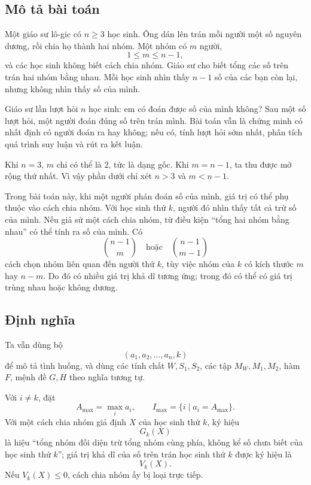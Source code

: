 \documentclass[11pt]{article}
\begin{document}
\subsection*{Mô tả bài toán}

Một giáo sư lô-gic có \(n\ge 3\) học sinh. Ông dán lên trán mỗi người một số
nguyên dương, rồi chia họ thành hai nhóm. Một nhóm có \(m\) người,
\[
  1\le m\le n-1,
\]
và các học sinh không biết cách chia nhóm. Giáo sư cho biết tổng các số trên
trán hai nhóm bằng nhau. Mỗi học sinh nhìn thấy \(n-1\) số của các bạn còn
lại, nhưng không nhìn thấy số của mình.

Giáo sư lần lượt hỏi \(n\) học sinh: em có đoán được số của mình không? Sau
một số lượt hỏi, một người đoán đúng số trên trán mình. Bài toán vẫn là
chứng minh có nhất định có người đoán ra hay không; nếu có, tính lượt hỏi sớm
nhất, phân tích quá trình suy luận và rút ra kết luận.

Khi \(n=3\), \(m\) chỉ có thể là \(2\), tức là dạng gốc. Khi \(m=n-1\), ta
thu được mở rộng thứ nhất. Vì vậy phần dưới chỉ xét \(n>3\) và \(m<n-1\).

Trong bài toán này, khi một người phán đoán số của mình, giá trị có thể phụ
thuộc vào cách chia nhóm. Với học sinh thứ \(k\), người đó nhìn thấy tất cả
trừ số của mình. Nếu giả sử một cách chia nhóm, từ điều kiện ``tổng hai nhóm
bằng nhau'' có thể tính ra số của mình. Có
\[
  \binom{n-1}{m}\quad\text{hoặc}\quad \binom{n-1}{m-1}
\]
cách chọn nhóm liên quan đến người thứ \(k\), tùy việc nhóm của \(k\) có
kích thước \(m\) hay \(n-m\). Do đó có nhiều giá trị khả dĩ tương ứng; trong
đó có thể có giá trị trùng nhau hoặc không dương.

\subsection*{Định nghĩa}

Ta vẫn dùng bộ
\[
  (a_1,a_2,\ldots,a_n,k)
\]
để mô tả tình huống, và dùng các tính chất \(W,S_1,S_2\), các tập
\(M_W,M_1,M_2\), hàm \(F\), mệnh đề \(G,H\) theo nghĩa tương tự.

Với \(i\ne k\), đặt
\[
  A_{\max}=\max_i a_i,\qquad
  I_{\max}=\{i\mid a_i=A_{\max}\}.
\]
Với một cách chia nhóm giả định \(X\) của học sinh thứ \(k\), ký hiệu
\[
  G_k(X)
\]
là hiệu ``tổng nhóm đối diện trừ tổng nhóm cùng phía, không kể số chưa biết
của học sinh thứ \(k\)''; giá trị khả dĩ của số trên trán học sinh thứ \(k\)
được ký hiệu là
\[
  V_k(X).
\]
Nếu \(V_k(X)\le 0\), cách chia nhóm ấy bị loại trực tiếp.
\end{document}

